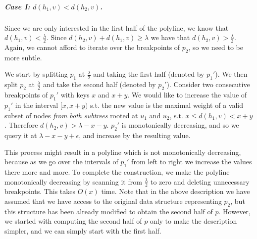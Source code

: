 \documentclass[a4paper,UKenglish]{lipics-v2016}
\theoremstyle{plain}
\renewcommand{\paragraph}{\subparagraph}
\begin{document}
\paragraph{Case I: \boldmath$d(h_1,v) < d(h_2,v)$.} Since we are only interested in the first half of the polyline, we know that $d(h_1,v) < \frac{\lambda}{2}$. Since $d(h_2,v) +d(h_1,v)\geq \lambda$ we have that  $d(h_2,v) > \frac{\lambda}{2}$. Again, we cannot afford to iterate over the breakpoints of $p_2$, so we need to be more subtle.

We start by splitting $p_1$ at $\frac{\lambda}{2}$ and taking the first half (denoted by $p_1'$). We then split $p_2$ at $\frac{\lambda}{2}$ and take the second half (denoted by $p_2'$). Consider two consecutive breakpoints of $p_1'$ with keys $x$ and $x+y$. We would like to increase the value of $p_1'$ in the interval $[x,x+y)$ s.t. the new value is the maximal weight of a valid subset of nodes \emph{from both subtrees} rooted at $u_1$ and $u_2$, s.t. $x \leq d(h_1,v)<x+y$. Therefore $d(h_2,v)>\lambda-x-y$. $p_2'$ is monotonically decreasing, and so we query it at $\lambda-x-y+\epsilon$, and increase by the resulting value.

This process might result in a polyline which is not monotonically decreasing, because as we go over the intervals of $p_1'$ from left to right we increase the values there more and more.
To complete the construction, we make the polyline monotonically decreasing by scanning it from $\frac{\lambda}{2}$ to zero and deleting unnecessary breakpoints. This takes $O(x)$ time.
Note that in the above description we have assumed that we have access to the original data structure representing $p_{2}$, but this structure has been already modified to obtain the second half of $p$. However, we started with computing the second half of $p$ only to make the description simpler, and we can simply start with the first half.

\end{document}
